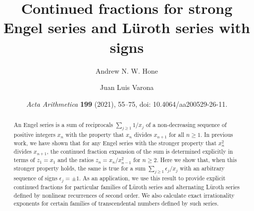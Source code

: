 \documentclass[12pt,a4paper]{amsart}
\theoremstyle{definition}
\numberwithin{equation}{section}
\newcommand\eps{{\epsilon}}
\begin{document}


\title[Continued fractions for strong Engel series with signs]
{Continued fractions for strong Engel series 
and L\"{u}roth series with signs} 

\author[A. N. W. Hone]{Andrew N. W. Hone}
\address[Andrew N. W. Hone]{School of Mathematics, Statistics and Actuarial Science\\ 
University of Kent\\ 
Canterbury CT2 7FS, UK}

\author[J. L. Varona]{Juan Luis Varona}
\address[Juan Luis Varona]{Departamento de Matem\'aticas y Computaci\'on\\  
Universidad de La Rioja\\ 
26006 Logro\~no, Spain}



\renewcommand{\datename}{THIS PAPER HAS BEEN PUBLISHED IN:}
\date{\textit{Acta Arithmetica} \textbf{199} (2021), 55--75, doi: 10.4064/aa200529-26-11.}

\begin{abstract} 
An Engel series is a sum of 
reciprocals $\sum_{j\geq 1} 1/x_j$ of a non-decreasing sequence of positive integers $x_n$
with the property that $x_n$ divides $x_{n+1}$ for all $n\geq 1$. In previous work, 
we have shown that for any Engel series with the stronger property 
that $x_n^2$ divides $x_{n+1}$, the continued fraction expansion of the sum 
is determined explicitly in terms of $z_1=x_1$ and the ratios $z_n=x_n/x_{n-1}^2$ for $n\geq 2$. 
Here we show that, when this stronger property holds, 
the same is true for a sum $\sum_{j\geq 1}\eps_j/x_j$ 
with an arbitrary 
sequence of signs $\eps_j=\pm 1$. 
As an application, we use this result to provide explicit continued fractions for particular families 
of L\"{u}roth series and alternating L\"{u}roth series defined by nonlinear recurrences of second order.  
We also calculate exact irrationality exponents for certain families of transcendental numbers 
defined by such series. 
\end{abstract}

\end{document}
